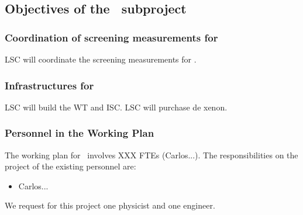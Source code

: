\subsection{Objectives of the \sLSC\ subproject}
\label{sec.obj.lsc}

\subsubsection*{Coordination of screening measurements for \NHD}

\indent

LSC will coordinate the screening measurements for \NHD. 
 
\subsubsection*{Infrastructures for \NHD}

\indent

LSC will build the WT and ISC. LSC will purchase de xenon.   
 

\subsubsection*{Personnel in the Working Plan}
The working plan for \sLSC\ involves XXX FTEs (Carlos...). The responsibilities on the project of the existing personnel are:


\begin{itemize}[noitemsep,topsep=0pt,parsep=0pt,partopsep=0pt]
\item Carlos... 
\end{itemize}

We request for this project one physicist and one engineer. 
